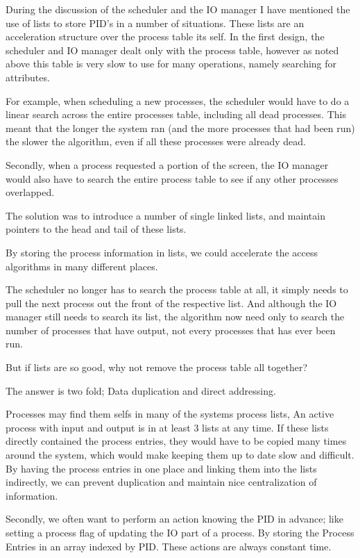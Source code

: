 \documentclass[a4paper]{report}
\begin{document}
During the discussion of the scheduler and the IO manager I have mentioned the use of lists to store PID's in a number of situations. These lists are an acceleration structure over the process table its self. In the first design, the scheduler and IO manager dealt only with the process table, however as noted above this table is very slow to use for many operations, namely searching for attributes.

For example, when scheduling a new processes, the scheduler would have to do a linear search across the entire processes table, including all dead processes. This meant that the longer the system ran (and the more processes that had been run) the slower the algorithm, even if all these processes were already dead.

Secondly, when a process requested a portion of the screen, the IO manager would also have to search the entire process table to see if any other processes overlapped.

The solution was to introduce a number of single linked lists, and maintain pointers to the head and tail of these lists.

By storing the process information in lists, we could accelerate the access algorithms in many different places.

The scheduler no longer has to search the process table at all, it simply needs to pull the next process out the front of the respective list. And although the IO manager still needs to search its list, the algorithm now need only to search the number of processes that have output, not every processes that has ever been run.

But if lists are so good, why not remove the process table all together?

The answer is two fold; Data duplication and direct addressing.

Processes may find them selfs in many of the systems process lists, An active process with input and output is in at least 3 lists at any time. If these lists directly contained the process entries, they would have to be copied many times around the system, which would make keeping them up to date slow and difficult. By having the process entries in one place and linking them into the lists indirectly, we can prevent duplication and maintain nice centralization of information.

Secondly, we often want to perform an action knowing the PID in advance; like setting a process flag of updating the IO part of a process. By storing the Process Entries in an array indexed by PID. These actions are always constant time.
\end{document}

